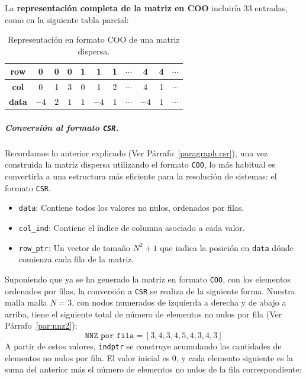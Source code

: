 \documentclass{article}
\begin{document}
\noindent La \textbf{representación completa de la matriz en COO} incluiría 33 entradas, como en la siguiente tabla parcial:

\begin{table}[htbp]
\centering
\begin{tabular}{|c|c|c|c|c|c|c|c|c|c|c|}
\hline
\textbf{row} & 0 & 0 & 0 & 1 & 1 & 1 & $\cdots$ & 4 & 4 & $\cdots$\\ 
\hline
\textbf{col} & 0 & 1 & 3 & 0 & 1 & 2 & $\cdots$ & 4 & 1 & $\cdots$ \\
\hline
\textbf{data} & $-4$ & $2$ & $1$ & $1$ & $-4$ & $1$ & $\cdots$ & $-4$ & $1$  & $\cdots$ \\
\hline
\end{tabular}
\caption{Representación en formato COO de una matriz dispersa.}
\label{tab:coo_horizontal}
\end{table}

\subparagraph{Conversión al formato \texttt{CSR}.} Recordamos lo anterior explicado (Ver Párrafo~\ref{paragraph:csr}), una vez construida la matriz dispersa utilizando el formato \texttt{COO}, lo más habitual es convertirla a una estructura más eficiente para la resolución de sistemas: el formato \texttt{CSR}. 

\begin{itemize}
    \item \texttt{data}: Contiene todos los valores no nulos, ordenados por filas.
    \item \texttt{col\_ind}: Contiene el índice de columna asociado a cada valor.
    \item \texttt{row\_ptr}: Un vector de tamaño $N^2 + 1$ que indica la posición en \texttt{data} dónde comienza cada fila de la matriz.
\end{itemize}

\noindent Suponiendo que ya se ha generado la matriz en formato \texttt{COO}, con los elementos ordenados por filas, la conversión a \texttt{CSR} se realiza de la siguiente forma. Nuestra malla malla $N=3$, con nodos numerados de izquierda a derecha y de abajo a arriba, tiene el siguiente total de número de elementos no nulos por fila (Ver Párrafo~\ref{par:nnz2}):
$$
\texttt{NNZ por fila} = [3,4,3,4,5,4,3,4,3]
$$
A partir de estos valores, \texttt{indptr} se construye acumulando las cantidades de elementos no nulos por fila. El valor inicial es 0, y cada elemento siguiente es la suma del anterior más el número de elementos no nulos de la fila correspondiente:
\end{document}
